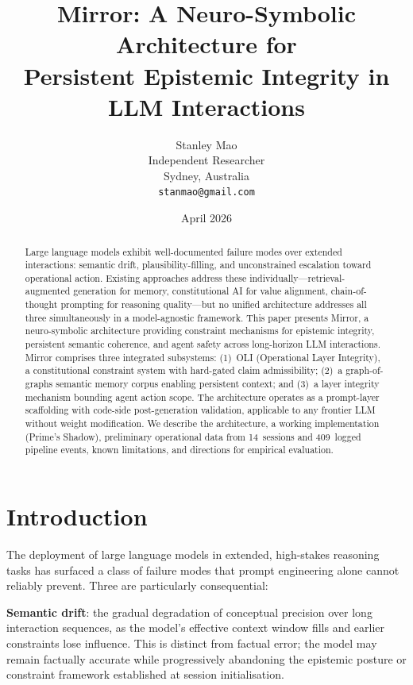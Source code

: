 \documentclass[11pt,a4paper]{article}
\title{Mirror: A Neuro-Symbolic Architecture for\\Persistent Epistemic Integrity in LLM Interactions}
\author{
    Stanley Mao \\
    Independent Researcher \\
    Sydney, Australia \\
    \texttt{stanmao@gmail.com}
}
\date{April 2026}
\begin{document}
\maketitle

\begin{abstract}
Large language models exhibit well-documented failure modes over extended interactions: semantic drift, plausibility-filling, and unconstrained escalation toward operational action.
Existing approaches address these individually---retrieval-augmented generation for memory, constitutional AI for value alignment, chain-of-thought prompting for reasoning quality---but no unified architecture addresses all three simultaneously in a model-agnostic framework.
This paper presents Mirror, a neuro-symbolic architecture providing constraint mechanisms for epistemic integrity, persistent semantic coherence, and agent safety across long-horizon LLM interactions.
Mirror comprises three integrated subsystems: (1)~OLI (Operational Layer Integrity), a constitutional constraint system with hard-gated claim admissibility; (2)~a graph-of-graphs semantic memory corpus enabling persistent context; and (3)~a layer integrity mechanism bounding agent action scope.
The architecture operates as a prompt-layer scaffolding with code-side post-generation validation, applicable to any frontier LLM without weight modification.
We describe the architecture, a working implementation (Prime's Shadow), preliminary operational data from 14~sessions and 409~logged pipeline events, known limitations, and directions for empirical evaluation.
\end{abstract}

\section{Introduction}
\label{sec:intro}

The deployment of large language models in extended, high-stakes reasoning tasks has surfaced a class of failure modes that prompt engineering alone cannot reliably prevent.
Three are particularly consequential:

\textbf{Semantic drift}: the gradual degradation of conceptual precision over long interaction sequences, as the model's effective context window fills and earlier constraints lose influence.
This is distinct from factual error; the model may remain factually accurate while progressively abandoning the epistemic posture or constraint framework established at session initialisation.
\end{document}
